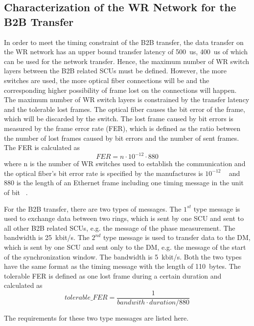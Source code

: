 \subsection{Characterization of the WR Network for the B2B Transfer}
In order to meet the timing constraint of the B2B transfer, the data transfer on the WR network has an upper bound transfer latency of \SI{500}{us}, \SI{400}{us} of which can be used for the network transfer. Hence, the maximum number of WR switch layers between the B2B related SCUs must be defined. However, the more switches are used, the more optical fiber connections will be and the corresponding higher possibility of frame lost on the connections will happen. The maximum number of WR switch layers is constrained by the transfer latency and the tolerable lost frames. The optical fiber causes the bit error of the frame, which will be discarded by the switch. The lost frame caused by bit errors is measured by the frame error rate (FER), which is defined as the ratio between the number of lost frames caused by bit errors and the number of sent frames. The FER is calculated as ~\cite{prados_white_2011}
\begin{equation}
\label{FER}
	FER=n\cdot10^{-12}\cdot880
\end{equation}
where n is the number of WR switches used to establish the communication and the optical fiber's bit error rate is specified by the manufactures is $10^{-12}$ ~\cite{noauthor_datasheet_nodate} and 880 is the length of an Ethernet frame including one timing message in the unit of bit ~\cite{beck_timing_2015}.  

For the B2B transfer, there are two types of messages. The $1^\mathit{st}$ type message is used to exchange data between two rings, which is sent by one SCU and sent to all other B2B related SCUs, e.g. the message of the phase measurement. The bandwidth is \SI{25}{kbit/s}. The $2^\mathit{nd}$ type message is used to transfer data to the DM, which is sent by one SCU and sent only to the DM, e.g. the message of the start of the synchronization window. The bandwidth is \SI{5}{kbit/s}. Both the two types have the same format as the timing message with the length of \SI{110}{bytes}. The tolerable FER is defined as one lost frame during a certain duration and calculated as 
\begin{equation}
	tolerable\_FER=\frac{1}{bandwith\cdot duration/880}
\end{equation}

The requirements for these two type messages are listed here.

